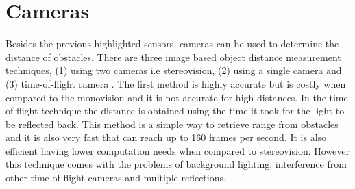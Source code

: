 \section{Cameras}
Besides the previous highlighted sensors, cameras can be used to determine the distance of obstacles. There are three image based object distance measurement techniques, (1) using two cameras i.e stereovision, (2) using a single camera and (3) time-of-flight camera \cite{cam}.
The first method is highly accurate but is costly when compared to the monovision and it is not accurate for high distances. In the time of flight technique the distance is obtained using the time it took for the light to be reflected back. This method is a simple way to retrieve range from obstacles and it is also very fast that can reach up to 160 frames per second. It is also efficient having lower computation needs when compared to stereovision. However this technique comes with the problems of background lighting, interference from other time of flight cameras and multiple reflections. 



